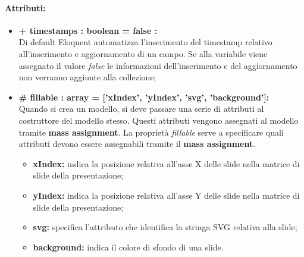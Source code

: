 	\paragraph{Attributi:}
	\begin{itemize}
		\item \textbf{+ timestamps : boolean = false :}\\
		Di default Eloquent automatizza l'inserimento del timestamp relativo all'inserimento e aggiornamento di un campo. Se alla variabile viene assegnato il valore \textit{false} le informazioni dell'inserimento e del aggiornamento non verranno aggiunte alla collezione;
		\item \textbf{\# fillable : array = [’xIndex’, ’yIndex', 'svg', 'background']:}\\
		Quando si crea un modello, si deve passare una serie di attributi al costruttore del modello stesso. Questi attributi vengono assegnati al modello tramite \textbf{mass assignment}. La proprietà \textit{fillable} serve a specificare quali attributi devono essere assegnabili tramite il \textbf{mass assignment}.
		\begin{itemize}
			\item \textbf{xIndex:} indica la posizione relativa all'asse X delle slide nella matrice di slide della presentazione;
			\item \textbf{yIndex:} indica la posizione relativa all'asse Y delle slide nella matrice di slide della presentazione;
			\item \textbf{svg:} specifica l'attributo che identifica la stringa SVG relativa alla slide;
			\item \textbf{background:} indica il colore di sfondo di una slide.
		\end{itemize}
	\end{itemize}
	
